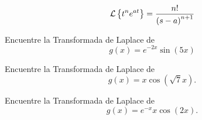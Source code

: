 {}
\begin{align}
\label{tlt:22}
\mathcal{L}\left\{ t^{n}e^{at} \right\} = \dfrac{n!}{\left( s-a \right)^{n+1}}
\end{align}


 \begin{problema}
  \label{bron:exmp:21.15}
  Encuentre la Transformada de Laplace de
  $$g(x)=e^{-2x}\sin(5x)$$
 \end{problema}




 \begin{problema}
  \label{bron:exmp:21.16}
  Encuentre la Transformada de Laplace de
  $$g(x)=x\cos(\sqrt{7}x).$$
 \end{problema}




 \begin{problema}
  \label{bron:exmp:21.17}
  Encuentre la Transformada de Laplace de
  $$g(x)=e^{-x}x\cos(2x).$$
 \end{problema}





